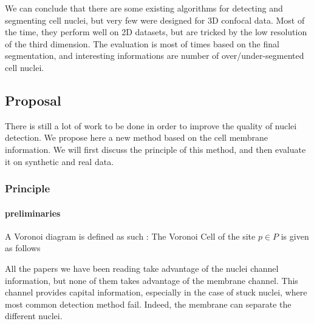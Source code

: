 We can conclude that there are some existing algorithms for detecting and segmenting cell nuclei,
but very few were designed for 3D confocal data.
Most of the time, they perform well on 2D datasets, but are tricked by the low resolution of the third dimension.
The evaluation is most of times based on the final segmentation, and interesting informations are number of over/under-segmented cell nuclei.


\subsection{Proposal}
\label{sect:proposal}
There is still a lot of work to be done in order to improve the quality of nuclei detection. We propose here a new method based on the cell membrane information. We will first discuss the principle of this method, and then evaluate it on synthetic and real data.

\subsubsection{Principle}

\paragraph{preliminaries}

A Voronoi diagram is defined as such :
The Voronoi Cell of the site \( p \in P \) is given as follows



All the papers we have been reading take advantage of the nuclei channel information, but none of them takes advantage of the membrane channel.
This channel provides capital information, especially in the case of stuck nuclei, where most common detection method fail.
Indeed, the membrane can separate the different nuclei.

\paragraph*{}

